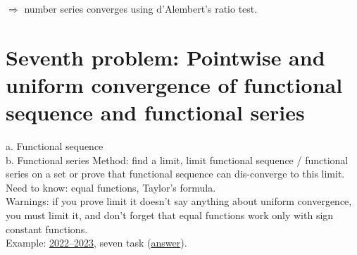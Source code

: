 \documentclass{article}
\begin{document}
     $\Rightarrow$ number series converges using d'Alembert's ratio test.


\newpage
\section{Seventh problem: Pointwise and uniform convergence of functional sequence and functional series}
a. Functional sequence \\
b. Functional series
Method: find a limit, limit functional sequence / functional series on a set or prove that functional sequence can dis-converge to this limit.\\
Need to know: equal functions, Taylor's formula. \\
Warnings: if you prove limit it doesn't say anything about uniform convergence, you must limit it, and don't forget that equal functions work only with sign constant functions. \\
Example: \href{https://old.mipt.ru/education/chair/mathematics/exams/exams/2022-23/%D0%9C%D0%90%D0%98%D0%B8%D0%A0_%D0%92_23.pdf}{2022–2023}, seven task (\href{https://old.mipt.ru/education/chair/mathematics/exams/exams/2022-23/%D0%9C%D0%90%D0%98%D0%B8%D0%A0_%D0%92_23%D0%BE%D1%82%D0%B2%D0%B5%D1%82%D1%8B.pdf}{answer}).
\end{document}
